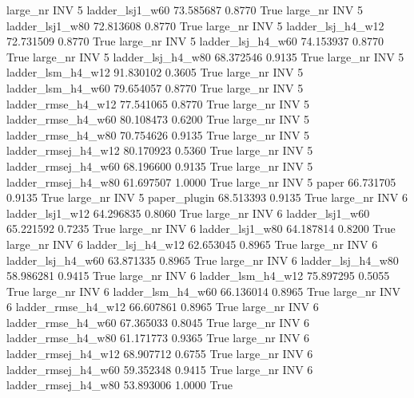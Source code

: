   large_nr      INV                 5     ladder_lsj1_w60   73.585687      0.8770    True
  large_nr      INV                 5     ladder_lsj1_w80   72.813608      0.8770    True
  large_nr      INV                 5   ladder_lsj_h4_w12   72.731509      0.8770    True
  large_nr      INV                 5   ladder_lsj_h4_w60   74.153937      0.8770    True
  large_nr      INV                 5   ladder_lsj_h4_w80   68.372546      0.9135    True
  large_nr      INV                 5   ladder_lsm_h4_w12   91.830102      0.3605    True
  large_nr      INV                 5   ladder_lsm_h4_w60   79.654057      0.8770    True
  large_nr      INV                 5  ladder_rmse_h4_w12   77.541065      0.8770    True
  large_nr      INV                 5  ladder_rmse_h4_w60   80.108473      0.6200    True
  large_nr      INV                 5  ladder_rmse_h4_w80   70.754626      0.9135    True
  large_nr      INV                 5 ladder_rmsej_h4_w12   80.170923      0.5360    True
  large_nr      INV                 5 ladder_rmsej_h4_w60   68.196600      0.9135    True
  large_nr      INV                 5 ladder_rmsej_h4_w80   61.697507      1.0000    True
  large_nr      INV                 5               paper   66.731705      0.9135    True
  large_nr      INV                 5        paper_plugin   68.513393      0.9135    True
  large_nr      INV                 6     ladder_lsj1_w12   64.296835      0.8060    True
  large_nr      INV                 6     ladder_lsj1_w60   65.221592      0.7235    True
  large_nr      INV                 6     ladder_lsj1_w80   64.187814      0.8200    True
  large_nr      INV                 6   ladder_lsj_h4_w12   62.653045      0.8965    True
  large_nr      INV                 6   ladder_lsj_h4_w60   63.871335      0.8965    True
  large_nr      INV                 6   ladder_lsj_h4_w80   58.986281      0.9415    True
  large_nr      INV                 6   ladder_lsm_h4_w12   75.897295      0.5055    True
  large_nr      INV                 6   ladder_lsm_h4_w60   66.136014      0.8965    True
  large_nr      INV                 6  ladder_rmse_h4_w12   66.607861      0.8965    True
  large_nr      INV                 6  ladder_rmse_h4_w60   67.365033      0.8045    True
  large_nr      INV                 6  ladder_rmse_h4_w80   61.171773      0.9365    True
  large_nr      INV                 6 ladder_rmsej_h4_w12   68.907712      0.6755    True
  large_nr      INV                 6 ladder_rmsej_h4_w60   59.352348      0.9415    True
  large_nr      INV                 6 ladder_rmsej_h4_w80   53.893006      1.0000    True
